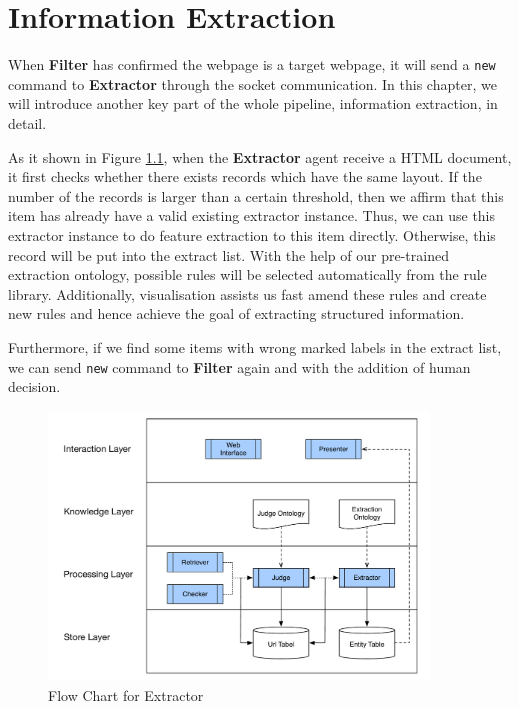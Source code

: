 \chapter{Information Extraction}\label{chapter:ie}
When \textbf{Filter} has confirmed the webpage is a target webpage, it will send a \texttt{new} command to \textbf{Extractor} through the socket communication. In this chapter, we will introduce another key part of the whole pipeline, information extraction, in detail.

As it shown in Figure \ref{fig:fc:extractor}, when the \textbf{Extractor} agent receive a HTML document, it first checks whether there exists records which have the same layout. If the number of the records is larger than a certain threshold, then we affirm that this item has already have a valid existing extractor instance. Thus, we can use this extractor instance to do feature extraction to this item directly. Otherwise, this record will be put into the extract list. With the help of our pre-trained extraction ontology, possible rules will be selected automatically from the rule library. Additionally, visualisation assists us fast amend these rules and create new rules and hence achieve the goal of extracting structured information.

Furthermore, if we find some items with wrong marked labels in the extract list, we can send \texttt{new} command to \textbf{Filter} again and with the addition of human decision.

\begin{figure}[htb!]
	\centering
	\includegraphics[page=7,width=0.9\textwidth]{images/diagrams.pdf}
	\caption{Flow Chart for Extractor}\label{fig:fc:extractor}
\end{figure}

